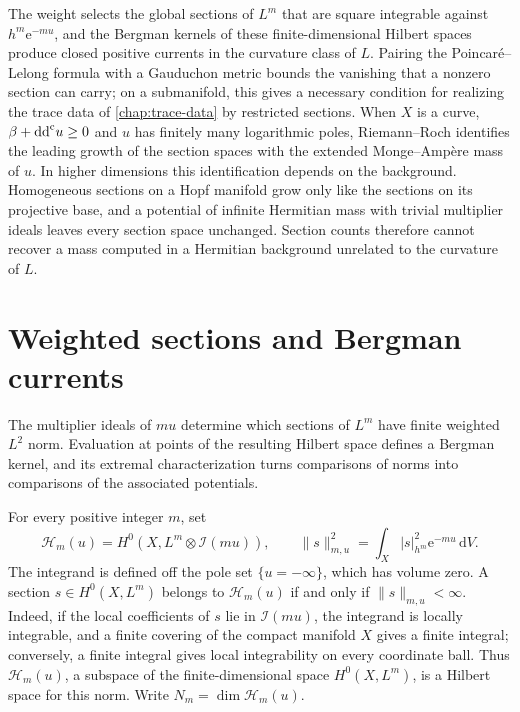The weight selects the global sections of $L^m$ that are square integrable against $h^m\mathrm{e}^{-mu}$, and the Bergman kernels of these finite-dimensional Hilbert spaces produce closed positive currents in the curvature class of $L$. Pairing the Poincar\'e--Lelong formula with a Gauduchon metric bounds the vanishing that a nonzero section can carry; on a submanifold, this gives a necessary condition for realizing the trace data of \cref{chap:trace-data} by restricted sections. When $X$ is a curve, $\beta+\mathrm{dd}^{\mathrm{c}} u\geq0$ and $u$ has finitely many logarithmic poles, Riemann--Roch identifies the leading growth of the section spaces with the extended Monge--Amp\`ere mass of $u$. In higher dimensions this identification depends on the background. Homogeneous sections on a Hopf manifold grow only like the sections on its projective base, and a potential of infinite Hermitian mass with trivial multiplier ideals leaves every section space unchanged. Section counts therefore cannot recover a mass computed in a Hermitian background unrelated to the curvature of $L$.

\section{Weighted sections and Bergman currents}\label{sec:weighted-section-spaces}\label{sec:weighted-bergman-kernel}

The multiplier ideals of $mu$ determine which sections of $L^m$ have finite weighted $L^2$ norm. Evaluation at points of the resulting Hilbert space defines a Bergman kernel, and its extremal characterization turns comparisons of norms into comparisons of the associated potentials.

For every positive integer $m$, set
\[
 \mathcal H_m(u)=H^0(X,L^m\otimes\mathcal I(mu)),\qquad
 \|s\|_{m,u}^2=\int_X|s|_{h^m}^2\mathrm{e}^{-mu}\,\mathrm{d}V.
\]
The integrand is defined off the pole set $\{u=-\infty\}$, which has volume zero. A section $s\in H^0(X,L^m)$ belongs to $\mathcal H_m(u)$ if and only if $\|s\|_{m,u}<\infty$. Indeed, if the local coefficients of $s$ lie in $\mathcal I(mu)$, the integrand is locally integrable, and a finite covering of the compact manifold $X$ gives a finite integral; conversely, a finite integral gives local integrability on every coordinate ball. Thus $\mathcal H_m(u)$, a subspace of the finite-dimensional space $H^0(X,L^m)$, is a Hilbert space for this norm. Write $N_m=\dim\mathcal H_m(u)$.

